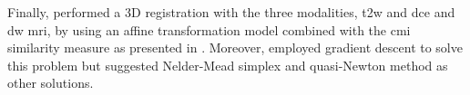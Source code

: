 Finally, \cite{Viswanath2011} performed a 3D registration with the three modalities, \ac{t2w} and \ac{dce} and \ac{dw} \ac{mri}, by using an affine transformation model combined with the \ac{cmi} similarity measure as presented in \cite{Chappelow2011}. Moreover, \cite{Chappelow2011} employed gradient descent to solve this problem but suggested Nelder-Mead simplex and quasi-Newton method as other solutions.
